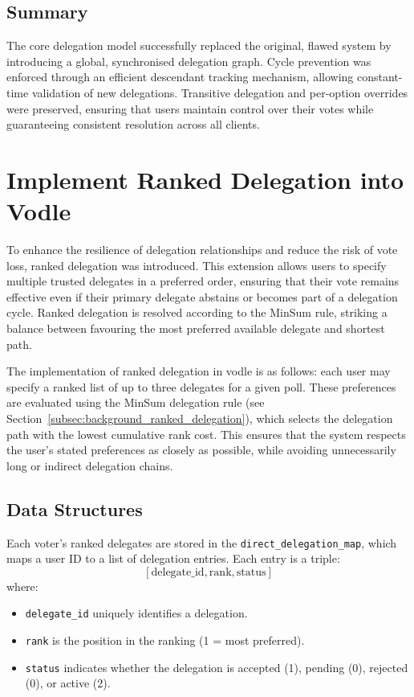 \subsection{Summary}

The core delegation model successfully replaced the original, flawed system by introducing a global, synchronised delegation graph. Cycle prevention was enforced through an efficient descendant tracking mechanism, allowing constant-time validation of new delegations. Transitive delegation and per-option overrides were preserved, ensuring that users maintain control over their votes while guaranteeing consistent resolution across all clients.

\section{Implement Ranked Delegation into Vodle}\label{sec:design_ranked_delegation}

To enhance the resilience of delegation relationships and reduce the risk of vote loss, ranked delegation was introduced. This extension allows users to specify multiple trusted delegates in a preferred order, ensuring that their vote remains effective even if their primary delegate abstains or becomes part of a delegation cycle. Ranked delegation is resolved according to the MinSum rule, striking a balance between favouring the most preferred available delegate and shortest path.

The implementation of ranked delegation in vodle is as follows: each user may specify a ranked list of up to three delegates for a given poll. These preferences are evaluated using the MinSum delegation rule (see Section~\ref{subsec:background_ranked_delegation}), which selects the delegation path with the lowest cumulative rank cost. This ensures that the system respects the user's stated preferences as closely as possible, while avoiding unnecessarily long or indirect delegation chains.

\subsection{Data Structures}
Each voter's ranked delegates are stored in the \texttt{direct\_delegation\_map}, which maps a user ID to a list of delegation entries. Each entry is a triple:
\[
[\text{delegate\_id}, \text{rank}, \text{status}]
\]
where:
\begin{itemize}
    \item \texttt{delegate\_id} uniquely identifies a delegation.
    \item \texttt{rank} is the position in the ranking (1 = most preferred).
    \item \texttt{status} indicates whether the delegation is accepted (1), pending (0), rejected (0), or active (2).
\end{itemize}

